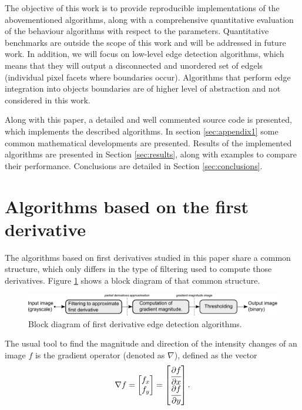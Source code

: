\documentclass{ipol}
\numberwithin{equation}{section}
\numberwithin{table}{section}
\begin{document}
The objective of this work is to provide reproducible implementations of the abovementioned algorithms, along with a comprehensive quantitative evaluation of the behaviour algorithms with respect to the parameters. Quantitative benchmarks are outside the scope of this work and will be addressed in future work.
In addition, we will focus on low-level edge detection algorithms, which means that they will output a disconnected and unordered set of edgels (individual pixel facets where boundaries occur). Algorithms that perform edge integration into objects boundaries are of higher level of abstraction and not considered in this work.

Along with this paper, a detailed and well commented source code is presented, which 
implements the described algorithms. In section \ref{sec:appendix1} some common mathematical developments are presented. 
Results of the implemented algorithms are presented in Section \ref{sec:results}, along with examples 
to compare their performance. Conclusions are detailed in Section \ref{sec:conclusions}.

\nocite{IPOL}


\section{Algorithms based on the first derivative}
\label{sec:first}

The algorithms based on first derivatives studied in this paper share a common structure, which only differs in the type of filtering used to compute those derivatives. Figure \ref{fig:blockdiagram1} shows a block diagram of that common structure. \\

\begin{figure}[h!]
	\centering
	\includegraphics[width=\textwidth]{blockdiagram1.pdf}
	\caption{Block diagram of first derivative edge detection algorithms.}
	\label{fig:blockdiagram1}
\end{figure}

The usual tool to find the magnitude and direction of the
intensity changes of an image $f$ is the gradient operator (denoted as $\nabla$), defined 
as the vector
\begin{equation}
	\nabla f = 
				\begin{bmatrix} 
					f_x \\ f_y
				\end{bmatrix}
	=				
				\begin{bmatrix} 
					\cfrac{\partial f}{\partial x} \\ \cfrac{\partial f}{\partial y} \\
				\end{bmatrix}.
\end{equation}
\end{document}
